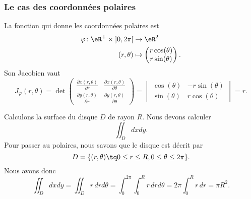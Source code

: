 \subsubsection{Le cas des coordonnées polaires}

La fonction qui donne les coordonnées polaires est
\begin{equation}
    \begin{aligned}
        \varphi\colon \eR^+\times\mathopen] 0 , 2\pi \mathclose[&\to \eR^2 \\
        (r,\theta)&\mapsto\begin{pmatrix}
            r\cos(\theta)    \\ 
            r\sin(\theta)    
        \end{pmatrix}.
    \end{aligned}
\end{equation}
Son Jacobien vaut
\begin{equation}
    J_{\varphi}(r,\theta)=\det\begin{pmatrix}
        \frac{ \partial x(r,\theta) }{ \partial r }    &   \frac{ \partial x(r,\theta) }{ \partial \theta }    \\ 
        \frac{ \partial y(r,\theta) }{ \partial r }    &   \frac{ \partial y(r,\theta) }{ \partial \theta }    
    \end{pmatrix}=
    \begin{vmatrix}
        \cos(\theta)    &   -r\sin(\theta)    \\ 
        \sin(\theta)    &   r\cos(\theta)    
    \end{vmatrix}=r.
\end{equation}

\begin{example}
    Calculons la surface du disque $D$ de rayon $R$. Nous devons calculer
    \begin{equation}
        \iint_Ddxdy.
    \end{equation}
    Pour passer au polaires, nous savons que le disque est décrit par 
    \begin{equation}
        D=\{ (r,\theta)\tq 0\leq r\leq R,0\leq\theta\leq 2\pi \}.
    \end{equation}
    Nous avons donc
    \begin{equation}
        \iint_Ddxdy=\iint_{D}r\,drd\theta=\int_0^{2\pi}\int_0^Rr\,drd\theta=2\pi\int_0^Rr\,dr=\pi R^2.
    \end{equation}
\end{example}

